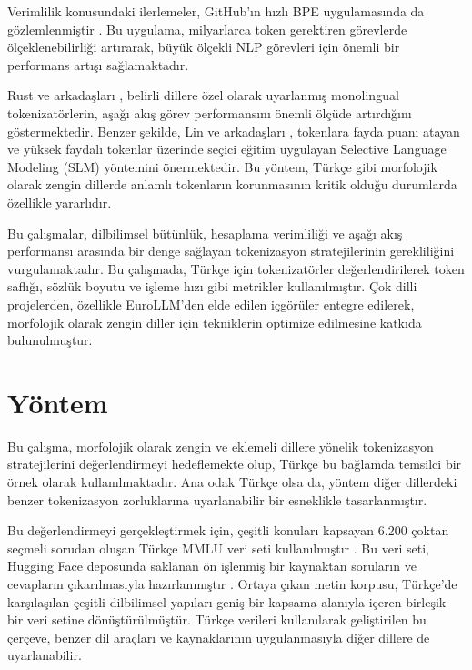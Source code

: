 \documentclass{article}
\begin{document}
Verimlilik konusundaki ilerlemeler, GitHub’ın hızlı BPE uygulamasında da gözlemlenmiştir \cite{neubeck_so_2024}. Bu uygulama, milyarlarca token gerektiren görevlerde ölçeklenebilirliği artırarak, büyük ölçekli NLP görevleri için önemli bir performans artışı sağlamaktadır.

Rust ve arkadaşları \cite{rust_how_2021}, belirli dillere özel olarak uyarlanmış monolingual tokenizatörlerin, aşağı akış görev performansını önemli ölçüde artırdığını göstermektedir. Benzer şekilde, Lin ve arkadaşları \cite{lin_not_nodate}, tokenlara fayda puanı atayan ve yüksek faydalı tokenlar üzerinde seçici eğitim uygulayan Selective Language Modeling (SLM) yöntemini önermektedir. Bu yöntem, Türkçe gibi morfolojik olarak zengin dillerde anlamlı tokenların korunmasının kritik olduğu durumlarda özellikle yararlıdır.

Bu çalışmalar, dilbilimsel bütünlük, hesaplama verimliliği ve aşağı akış performansı arasında bir denge sağlayan tokenizasyon stratejilerinin gerekliliğini vurgulamaktadır. Bu çalışmada, Türkçe için tokenizatörler değerlendirilerek token saflığı, sözlük boyutu ve işleme hızı gibi metrikler kullanılmıştır. Çok dilli projelerden, özellikle EuroLLM'den elde edilen içgörüler entegre edilerek, morfolojik olarak zengin diller için tekniklerin optimize edilmesine katkıda bulunulmuştur.

\section{Yöntem}

Bu çalışma, morfolojik olarak zengin ve eklemeli dillere yönelik tokenizasyon stratejilerini değerlendirmeyi hedeflemekte olup, Türkçe bu bağlamda temsilci bir örnek olarak kullanılmaktadır. Ana odak Türkçe olsa da, yöntem diğer dillerdeki benzer tokenizasyon zorluklarına uyarlanabilir bir esneklikle tasarlanmıştır.

Bu değerlendirmeyi gerçekleştirmek için, çeşitli konuları kapsayan 6.200 çoktan seçmeli sorudan oluşan Türkçe MMLU veri seti kullanılmıştır \cite{bayram_turkish_nodate}. Bu veri seti, Hugging Face deposunda saklanan ön işlenmiş bir kaynaktan soruların ve cevapların çıkarılmasıyla hazırlanmıştır \cite{bayram_turkish_nodate}. Ortaya çıkan metin korpusu, Türkçe'de karşılaşılan çeşitli dilbilimsel yapıları geniş bir kapsama alanıyla içeren birleşik bir veri setine dönüştürülmüştür. Türkçe verileri kullanılarak geliştirilen bu çerçeve, benzer dil araçları ve kaynaklarının uygulanmasıyla diğer dillere de uyarlanabilir.
\end{document}
